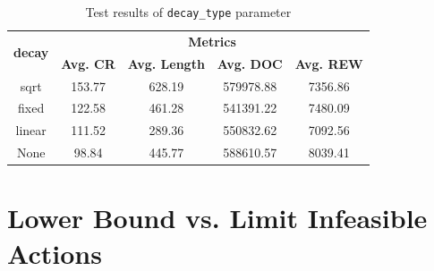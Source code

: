 \begin{table}[H]
	\centering
	\caption{Test results of \texttt{decay\_type} parameter}
	\begin{tabular}{ccccc}
		\toprule
		\multirow{2}{*}{\textbf{decay}} & \multicolumn{4}{c}{\textbf{Metrics}} \\ 
		\cmidrule(lr){2-5}
		& \textbf{Avg. CR} & \textbf{Avg. Length} & \textbf{Avg. DOC} & \textbf{Avg. REW} \\ 
		\midrule
		sqrt & 153.77 & 628.19 & 579978.88 & 7356.86 \\
		fixed & 122.58 & 461.28 & 541391.22 & 7480.09 \\
		linear & 111.52 & 289.36 & 550832.62 & 7092.56 \\
		None & 98.84 & 445.77 & 588610.57 & 8039.41 \\
		\bottomrule
	\end{tabular}
	\label{tab:test-decay2}
\end{table}

\section{Lower Bound vs. Limit Infeasible Actions}


